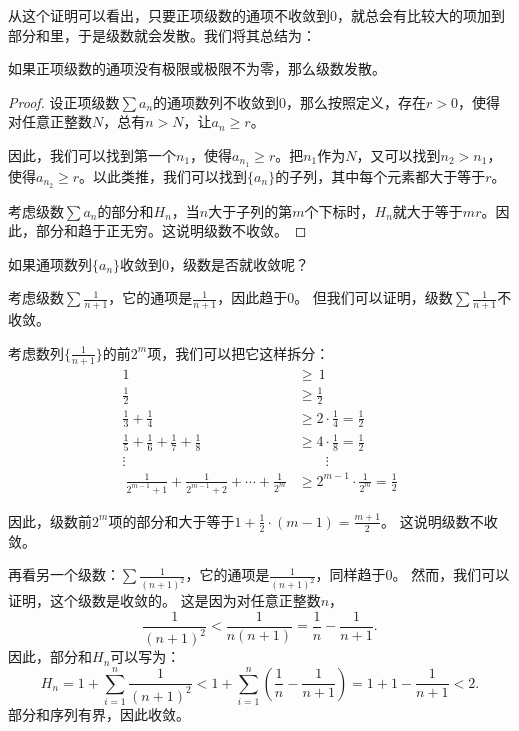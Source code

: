 \documentclass[12pt,UTF8]{ctexbook}
\begin{document}
从这个证明可以看出，只要正项级数的通项不收敛到$0$，就总会有比较大的项加到部分和里，于是级数就会发散。我们将其总结为：
\begin{tm}
    如果正项级数的通项没有极限或极限不为零，那么级数发散。
\end{tm}
\begin{proof}
    设正项级数$\sum a_n$的通项数列不收敛到$0$，那么按照定义，存在$r>0$，使得对任意正整数$N$，总有$n > N$，让$a_n \geqslant r$。

    因此，我们可以找到第一个$n_1$，使得$a_{n_1} \geqslant r$。把$n_1$作为$N$，又可以找到$n_2 > n_1$，
    使得$a_{n_2} \geqslant r$。以此类推，我们可以找到$\{a_n\}$的子列，其中每个元素都大于等于$r$。

    考虑级数$\sum a_n$的部分和$H_n$，当$n$大于子列的第$m$个下标时，$H_n$就大于等于$mr$。因此，部分和趋于正无穷。这说明级数不收敛。
\end{proof}

如果通项数列$\{a_n\}$收敛到$0$，级数是否就收敛呢？

考虑级数$\sum \frac{1}{n+1}$，它的通项是$\frac{1}{n+1}$，因此趋于$0$。
但我们可以证明，级数$\sum \frac{1}{n+1}$不收敛。

考虑数列$\{\frac{1}{n+1}\}$的前$2^m$项，我们可以把它这样拆分：
\begin{align*}
    1 \, &\geqslant \, 1  \\
    \frac{1}{2} &\geqslant \frac{1}{2}  \\
    \frac{1}{3} + \frac{1}{4} &\geqslant 2 \cdot \frac{1}{4} = \frac{1}{2}  \\
    \frac{1}{5} + \frac{1}{6} + \frac{1}{7} + \frac{1}{8} &\geqslant 4 \cdot \frac{1}{8} = \frac{1}{2}  \\
    \vdots \qquad & \qquad \vdots  \\\
    \frac{1}{2^{m-1}+1} + \frac{1}{2^{m-1}+2} + \cdots + \frac{1}{2^{m}} &\geqslant 2^{m-1} \cdot \frac{1}{2^{m}} = \frac{1}{2}  
\end{align*}

因此，级数前$2^m$项的部分和大于等于$1 + \frac12 \cdot (m - 1) = \frac{m+1}{2}$。
这说明级数不收敛。

再看另一个级数：$\sum \frac{1}{(n+1)^2}$，它的通项是$\frac{1}{(n+1)^2}$，同样趋于$0$。
然而，我们可以证明，这个级数是收敛的。
这是因为对任意正整数$n$，
$$ \frac{1}{(n+1)^2} < \frac{1}{n(n+1)} = \frac{1}{n} - \frac{1}{n+1}.$$
因此，部分和$H_n$可以写为：
$$ H_n = 1 + \sum_{i=1}^n \frac{1}{(n+1)^2} < 1 + \sum_{i=1}^n \left(\frac{1}{n} - \frac{1}{n+1}\right) = 1 + 1 - \frac{1}{n+1} < 2. $$
部分和序列有界，因此收敛。
\end{document}

